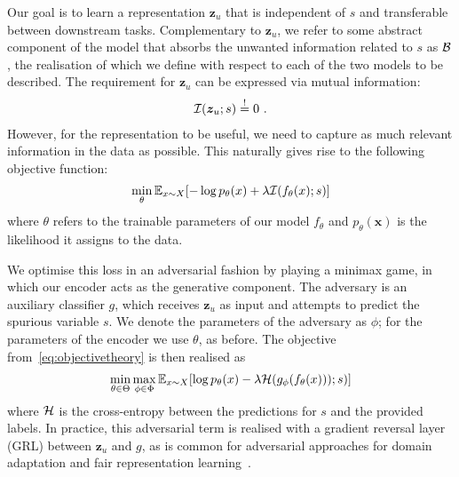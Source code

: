 Our goal is to learn a representation $\bm{z}_u$ that is independent of $s$ and transferable
between downstream tasks. 
%
Complementary to $\bm{z}_u$, we refer to some abstract component of the model that absorbs the
unwanted information related to $s$ as ${\mathcal{B}}$, the realisation of which we define with respect to
each of the two models to be described.
The requirement for $\bm{z}_u$ can be expressed via mutual information:
\begin{align}
  {\mathcal{I}}(\bm{z}_u;s) \overset{!}{=} 0~.
  \label{eq:migoal}
\end{align}
%
However, for the representation to be useful, we need to capture as much relevant information in
the data as possible. 
%
This naturally gives rise to the following objective function:
%
\begin{align}
  \min_{\theta} \mathbb{E}_{x \sim X}[-\log p_\theta(x) + \lambda {\mathcal{I}}(f_\theta(x);s)]
  \label{eq:objectivetheory}
\end{align}
%
where $\theta$ refers to the trainable parameters of our model $f_\theta$ and $p_\theta(\bm{x})$ is
the likelihood it assigns to the data.

We optimise this loss in an adversarial fashion by playing a minimax game, in which our encoder
acts as the generative component. 
%
The adversary is an auxiliary classifier $g$, which receives $\bm{z}_u$ as input and attempts to
predict the spurious variable $s$. 
%
We denote the parameters of the adversary as $\phi$; for the parameters of the encoder we use
$\theta$, as before. The objective from~\eqref{eq:objectivetheory} is then realised as 
%
\begin{align}
  \min_{ \theta \in \Theta} \max_{\phi \in \Phi} \mathbb{E}_{x \sim X}[\log p_\theta(x)
  -\lambda {\mathcal{H}} ( g_\phi ( f_\theta(x) )); s)] 
  \label{eq:objectivepractical}
\end{align} 
%
where \({\mathcal{H}}\) is the cross-entropy between the predictions for $s$ and the provided
labels.
%
In practice, this adversarial term is realised with a gradient reversal layer (GRL)
\citep{ganin2016domain} between $\bm{z}_u$ and $g$, as is common for adversarial approaches for
domain adaptation and fair representation learning~\citep{edwards2016censoring}.

